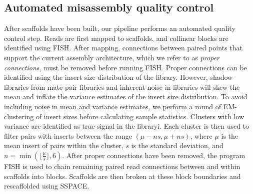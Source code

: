 \documentclass{bioinfo}
\begin{document}
\subsection{Automated misassembly quality control}

After scaffolds have been built, our pipeline performs an automated quality control step.
Reads are first mapped to scaffolds, and collinear blocks are identified using FISH. After mapping,
connections between paired points that support the current assembly architecture, which we refer to as 
\emph{proper connections}, must be removed before running FISH. Proper connections
can be identified using the insert size distribution of the library. However, shadow libraries from 
mate-pair libraries and inherent noise in libraries will skew the mean and inflate the variance 
estimates of the insert size distribution. To avoid including noise in mean and variance estimates, 
we perform a round of EM-clustering of insert sizes before calculating sample statistics. Clusters
with low variance are identified as true signal in the libraryi. Each cluster is then used to filter 
pairs with inserts between the range $(\mu-ns,\mu+ns)$, where $\mu$ is the mean insert of pairs within
the cluster, $s$ is the standard deviation, and $n = \min(\lfloor\frac{\mu}{s}\rfloor, 6)$. 
After proper connections have been removed, the program FISH is used to chain remaining paired read 
connections between and within scaffolds into blocks. Scaffolds are then broken at these block boundaries
and rescaffolded using SSPACE.
\end{document}
